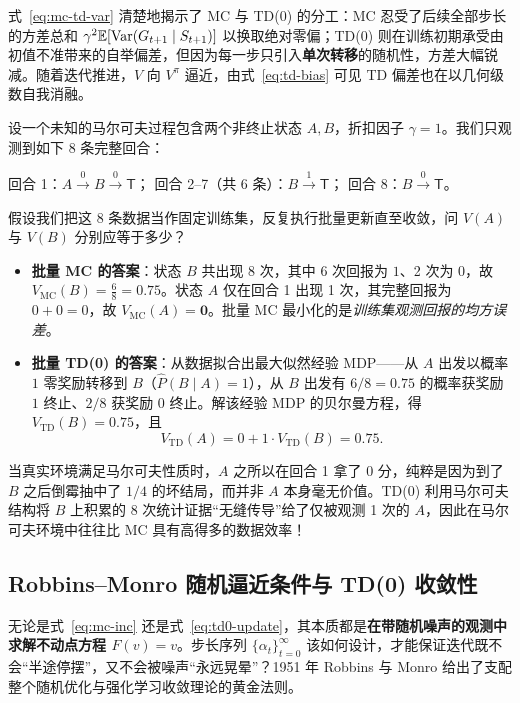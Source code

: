 式~\eqref{eq:mc-td-var} 清楚地揭示了 MC 与 TD(0) 的分工：MC 忍受了后续全部步长的方差总和 $\gamma^2 \mathbb{E}[\operatorname{Var}(G_{t+1}\mid S_{t+1})]$ 以换取绝对零偏；TD(0) 则在训练初期承受由初值不准带来的自举偏差，但因为每一步只引入\textbf{单次转移}的随机性，方差大幅锐减。随着迭代推进，$V$ 向 $V^\pi$ 逼近，由式~\eqref{eq:td-bias} 可见 TD 偏差也在以几何级数自我消融。

\begin{example}
\label{ex:batch-mc-td}
设一个未知的马尔可夫过程包含两个非终止状态 $A, B$，折扣因子 $\gamma = 1$。我们只观测到如下 8 条完整回合：
\begin{center}
\small
回合 1：$A \xrightarrow{0} B \xrightarrow{0} \mathsf{T}$；\qquad
回合 2--7（共 6 条）：$B \xrightarrow{1} \mathsf{T}$；\qquad
回合 8：$B \xrightarrow{0} \mathsf{T}$。
\end{center}
假设我们把这 8 条数据当作固定训练集，反复执行批量更新直至收敛，问 $V(A)$ 与 $V(B)$ 分别应等于多少？
\begin{itemize}
  \item \textbf{批量 MC 的答案}：状态 $B$ 共出现 8 次，其中 6 次回报为 $1$、2 次为 $0$，故 $V_{\mathrm{MC}}(B) = \frac{6}{8} = \mathbf{0.75}$。状态 $A$ 仅在回合 1 出现 1 次，其完整回报为 $0 + 0 = 0$，故 $V_{\mathrm{MC}}(A) = \mathbf{0}$。批量 MC 最小化的是\emph{训练集观测回报的均方误差}。
  \item \textbf{批量 TD(0) 的答案}：从数据拟合出最大似然经验 MDP——从 $A$ 出发以概率 $1$ 零奖励转移到 $B$（$\hat{P}(B\mid A) = 1$），从 $B$ 出发有 $6/8 = 0.75$ 的概率获奖励 $1$ 终止、$2/8$ 获奖励 $0$ 终止。解该经验 MDP 的贝尔曼方程，得 $V_{\mathrm{TD}}(B) = \mathbf{0.75}$，且
  \[
    V_{\mathrm{TD}}(A) = 0 + 1 \cdot V_{\mathrm{TD}}(B) = \mathbf{0.75}.
  \]
\end{itemize}
当真实环境满足马尔可夫性质时，$A$ 之所以在回合 1 拿了 0 分，纯粹是因为到了 $B$ 之后倒霉抽中了 $1/4$ 的坏结局，而并非 $A$ 本身毫无价值。TD(0) 利用马尔可夫结构将 $B$ 上积累的 8 次统计证据“无缝传导”给了仅被观测 1 次的 $A$，因此在马尔可夫环境中往往比 MC 具有高得多的数据效率！
\end{example}

\subsection{Robbins--Monro 随机逼近条件与 TD(0) 收敛性}

无论是式~\eqref{eq:mc-inc} 还是式~\eqref{eq:td0-update}，其本质都是\textbf{在带随机噪声的观测中求解不动点方程 $F(v) = v$}。步长序列 $\{\alpha_t\}_{t=0}^\infty$ 该如何设计，才能保证迭代既不会“半途停摆”，又不会被噪声“永远晃晕”？1951 年 Robbins 与 Monro 给出了支配整个随机优化与强化学习收敛理论的黄金法则。


